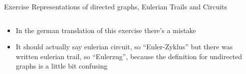 \begin{frame}[allowframebreaks]{Exercise \thesection}{Representations of directed graphs, Eulerian Trails and Circuits}
\begin{solution}
\begin{columns}
        \begin{column}{0.3\textwidth}
        \end{column}
        \begin{column}{0.4\textwidth}
          \resizebox{\textwidth}{!}{
            \begin{minipage}[t]{8cm}
              \centering
              \[ M(G) := 
                \begin{pmatrix}
                  1 & 0 & 0 & 0 & -1 & -1 & \textcolor{SecondaryColor}{1}\\
                  -1 & 1 & 0 & 0 & 0 & 0  & \textcolor{SecondaryColor}{0}\\
                  0 & -1 & 1 & 0 & 0 & 0  & \textcolor{SecondaryColor}{0} \\
                  0 & 0 & -1 & 1 & 1 & 0  & \textcolor{SecondaryColor}{-1}\\
                  0 & 0 & 0 & -1 & 0 & 1  & \textcolor{SecondaryColor}{0}
                \end{pmatrix}
              \]
            \end{minipage}
          }
        \end{column}
      \end{columns}
    \end{solution}
    \vspace{0.5cm}
    \begin{Sidenote}
      \begin{itemize}
        \item In the german translation of this exercise there's a \alert{mistake}
        \item It should actually say \alert{eulerian circuit}, so \alert{\enquote{Euler-Zyklus}} but there was written \alert{eulerian trail}, so \alert{\enquote{Eulerzug}}, because the definition for undirected graphs is a little bit confusing
      \end{itemize}
    \end{Sidenote}
\end{frame}
